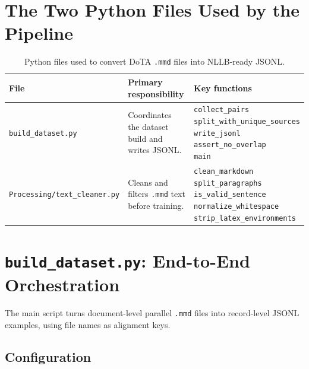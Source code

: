 \documentclass[12pt,a4paper]{article}
\begin{document}
\section{The Two Python Files Used by the Pipeline}

\begin{table}[H]
\centering
\caption{Python files used to convert DoTA \texttt{.mmd} files into NLLB-ready JSONL.}
\label{tab:python-files}
\renewcommand{\arraystretch}{1.25}
\begin{tabularx}{\linewidth}{lXl}
\toprule
\textbf{File} & \textbf{Primary responsibility} & \textbf{Key functions} \\
\midrule
\texttt{build\_dataset.py} & Coordinates the dataset build and writes JSONL. &
  \makecell[l]{\texttt{collect\_pairs}\\ \texttt{split\_with\_unique\_sources}\\ \texttt{write\_jsonl}\\ \texttt{assert\_no\_overlap}\\ \texttt{main}} \\
\addlinespace
\texttt{Processing/text\_cleaner.py} & Cleans and filters \texttt{.mmd} text before training. &
  \makecell[l]{\texttt{clean\_markdown}\\ \texttt{split\_paragraphs}\\ \texttt{is\_valid\_sentence}\\ \texttt{normalize\_whitespace}\\ \texttt{strip\_latex\_environments}} \\
\bottomrule
\end{tabularx}
\end{table}

\section{\texttt{build\_dataset.py}: End-to-End Orchestration}

The main script turns document-level parallel \texttt{.mmd} files into record-level JSONL examples, using file names as alignment keys.

\subsection{Configuration}
\end{document}
